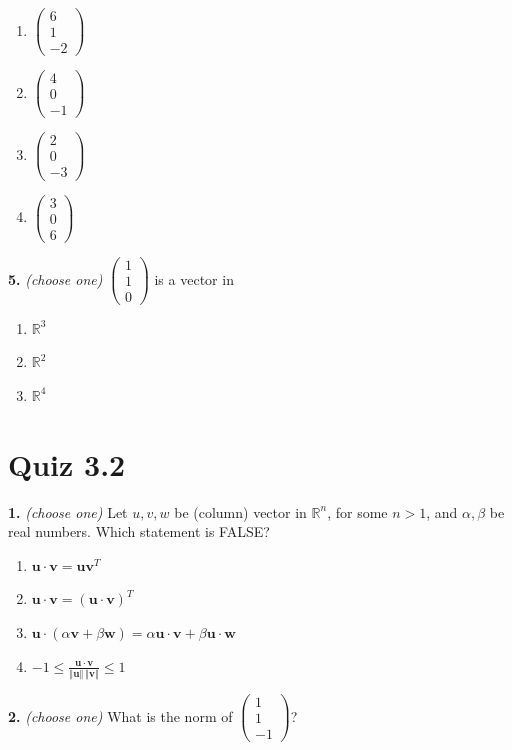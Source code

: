 \documentclass[10pt,a4paper]{article}
\begin{document}
\begin{enumerate}[label=(\Alph*)]
\item \(\begin{pmatrix}6\\1\\-2\end{pmatrix}\)
\item \(\begin{pmatrix}4\\0\\-1\end{pmatrix}\)
\item \(\begin{pmatrix}2\\0\\-3\end{pmatrix}\)
\item \(\begin{pmatrix}3\\0\\6\end{pmatrix}\)
\end{enumerate}
\smallskip
\textbf{5.} \textit{(choose one)} \(\begin{pmatrix}1\\1\\0\end{pmatrix}\) is a vector in

\begin{enumerate}[label=(\Alph*)]
\item \(\mathbb{R}^3\)
\item \(\mathbb{R}^2\)
\item \(\mathbb{R}^4\)
\end{enumerate}
\smallskip
\section{Quiz 3.2}
\textbf{1.} \textit{(choose one)} Let \(u,v,w\) be (column) vector in \(\mathbb{R}^n\), for some \(n>1\), and \(\alpha,\beta\) be real numbers. Which statement is FALSE?

\begin{enumerate}[label=(\Alph*)]
\item \(\mathbf{u\cdot v}=\mathbf{u v}^T\)
\item \(\mathbf{u\cdot v=(u\cdot v)}^T\)
\item \(\mathbf{u}\cdot(\alpha \mathbf{v}+\beta \mathbf{w})=\alpha \mathbf{u\cdot v}+\beta \mathbf{u\cdot w}\)
\item \(-1\leq\frac{\mathbf{u\cdot v}}{\Vert\mathbf{u}\Vert\,\Vert \mathbf{v}\Vert}\leq 1\)
\end{enumerate}
\smallskip
\textbf{2.} \textit{(choose one)} What is the norm of \(\begin{pmatrix}1\\1\\-1\end{pmatrix}\)?
\end{document}

